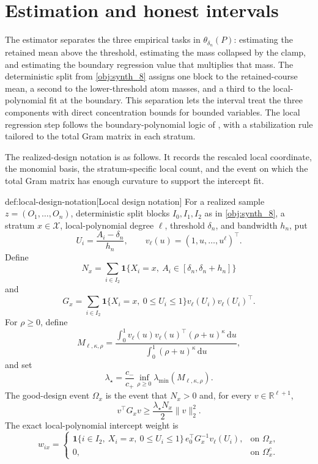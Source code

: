 \section{Estimation and honest intervals}
\label{sec:estimation-intervals}

The estimator separates the three empirical tasks in \(\theta_{\delta_n}(P)\): estimating the retained mean above the threshold, estimating the mass collapsed by the clamp, and estimating the boundary regression value that multiplies that mass. The deterministic split from \cref{obj:synth_8} assigns one block to the retained-course mean, a second to the lower-threshold atom masses, and a third to the local-polynomial fit at the boundary. This separation lets the interval treat the three components with direct concentration bounds for bounded variables. The local regression step follows the boundary-polynomial logic of \citet{Fan1996}, with a stabilization rule tailored to the total Gram matrix in each stratum.

The realized-design notation is as follows. It records the rescaled local coordinate, the  monomial basis, the stratum-specific local count, and the event on which the total Gram matrix has enough curvature to support the intercept fit.

\begin{definitionv}{def:local-design-notation}[Local design notation]
For a realized sample \(z=(O_1,\ldots,O_n)\), deterministic split blocks \(I_0,I_1,I_2\) as in \cref{obj:synth_8}, a stratum \(x\in\mathcal X\), local-polynomial degree \(\ell\), threshold \(\delta_n\), and bandwidth \(h_n\), put
\[
U_i=\frac{A_i-\delta_n}{h_n},
\qquad
v_\ell(u)=(1,u,\ldots,u^\ell)^\top .
\]
Define
\[
N_x
=
\sum_{i\in I_2}\mathbf 1\{X_i=x,\ A_i\in[\delta_n,\delta_n+h_n]\}
\]
and
\[
G_x
=
\sum_{i\in I_2}
\mathbf 1\{X_i=x,\ 0\leq U_i\leq1\}
v_\ell(U_i)v_\ell(U_i)^\top .
\]
For \(\rho\geq0\), define
\[
M_{\ell,\kappa,\rho}
=
\frac{\int_0^1v_\ell(u)v_\ell(u)^\top(\rho+u)^\kappa\,\mathrm du}
{\int_0^1(\rho+u)^\kappa\,\mathrm du},
\]
and set
\[
\lambda_\star
=
\frac{c_-}{c_+}
\inf_{\rho\geq0}
\lambda_{\min}\!\left(M_{\ell,\kappa,\rho}\right).
\]
The good-design event \(\Omega_x\) is the event that \(N_x>0\) and, for every \(v\in\mathbb R^{\ell+1}\),
\[
v^\top G_xv
\geq
\frac{\lambda_\star N_x}{2}\lVert v\rVert_2^2 .
\]
The exact local-polynomial intercept weight is
\[
w_{ix}
=
\begin{cases}
\mathbf 1\{i\in I_2,\ X_i=x,\ 0\leq U_i\leq1\}\,
e_0^\top G_x^{-1}v_\ell(U_i),
& \text{on }\Omega_x,\\
0, & \text{on }\Omega_x^c .
\end{cases}
\]
\end{definitionv}


